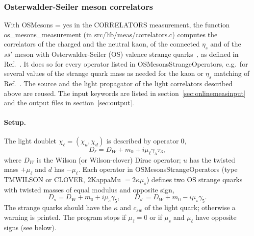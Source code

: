 \subsubsection{Osterwalder-Seiler meson correlators}
\label{sec:osmesons}

\providecommand{\id}{1\!\!1}
\providecommand{\Tr}{\operatorname{Tr}}
\providecommand{\vev}[1]{\left\langle #1 \right\rangle}
\begingroup\sloppy

With {\ttfamily OSMesons = yes} in the {\ttfamily CORRELATORS} measurement, the function
{\ttfamily os\_mesons\_measurement} (in {\ttfamily src/lib/meas/correlators.c}) computes the correlators of the charged and the neutral kaon, of the connected $\eta_s$ and of the
$s\bar s'$ meson with Osterwalder-Seiler (OS) valence strange quarks~\cite{Frezzotti:2004wz},
as defined in Ref.~\cite{Ottnad:2015hva}. It does so for every operator listed in
{\ttfamily OSMesonsStrangeOperators}, e.g.\ for several values of the strange quark mass
as needed for the kaon or $\eta_s$ matching of Ref.~\cite{Ottnad:2015hva}.
The source and the light propagator of the light correlators described above are reused.
The input keywords are listed in section~\ref{sec:onlinemeasinput} and the output
files in section~\ref{sec:output}.

\paragraph{Setup.}
The light doublet $\chi_\ell=(\chi_u,\chi_d)$ is described by operator $0$,
\begin{equation}
  D_\ell = D_W + m_0 + i\mu_\ell\gamma_5\tau_3 ,
\end{equation}
where $D_W$ is the Wilson (or Wilson-clover) Dirac operator; $u$ has the twisted mass $+\mu_\ell$
and $d$ has $-\mu_\ell$.
Each operator in {\ttfamily OSMesonsStrangeOperators} (type {\ttfamily TMWILSON} or {\ttfamily CLOVER},
{\ttfamily 2KappaMu} $=2\kappa\mu_s$) defines two OS strange quarks with twisted masses
of equal modulus and opposite sign,
\begin{equation}
  D_s = D_W + m_0 + i\mu_s\gamma_5 , \qquad
  D_{s'} = D_W + m_0 - i\mu_s\gamma_5 .
  \label{eq:os:Ds}
\end{equation}
The strange quarks should have the $\kappa$ and $c_{sw}$ of the light quark; otherwise a warning is printed.
The program stops if $\mu_\ell=0$ or if $\mu_s$ and $\mu_\ell$ have opposite signs (see below).

